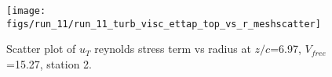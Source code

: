 \begin{figure}[H]
\centering
\texttt{[image: figs/run\_11/run\_11\_turb\_visc\_ettap\_top\_vs\_r\_meshscatter]}
\caption{Scatter plot of $
u_T$ reynolds stress term vs radius at $z/c$=6.97, $V_{free}$=15.27, station 2.}
\label{fig:run_11_turb_visc_ettap_top_vs_r_meshscatter}
\end{figure}


